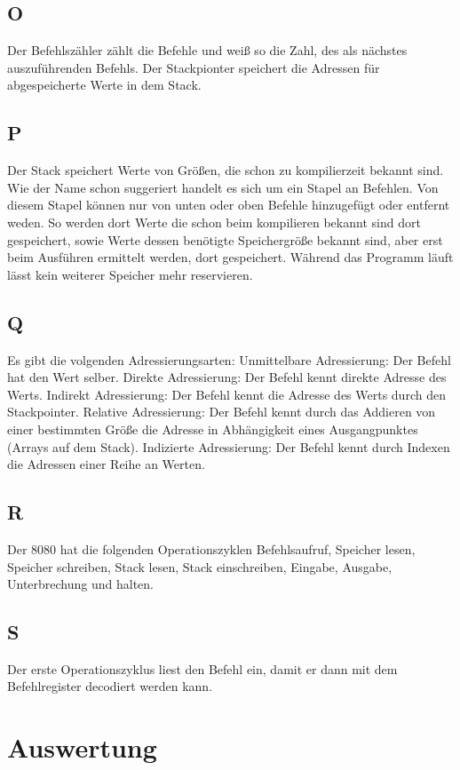 \documentclass[10pt]{article}
\begin{document}
\begin{multicols}{2}
  \subsection*{O}
  Der Befehlszähler zählt die Befehle und weiß so die Zahl, des als nächstes auszuführenden Befehls. Der Stackpionter speichert die Adressen für abgespeicherte Werte in dem Stack.
  \subsection*{P}
  Der Stack speichert Werte von Größen, die schon zu kompilierzeit bekannt sind. Wie der Name schon suggeriert handelt es sich um ein Stapel an Befehlen. Von diesem Stapel können nur von unten oder oben Befehle hinzugefügt oder entfernt weden. So werden dort Werte die schon beim kompilieren bekannt sind dort gespeichert, sowie Werte dessen benötigte Speichergröße bekannt sind, aber erst beim Ausführen ermittelt werden, dort gespeichert. Während das Programm läuft lässt kein weiterer Speicher mehr reservieren.
  \subsection*{Q}
  Es gibt die volgenden Adressierungsarten:
  Unmittelbare Adressierung: Der Befehl hat den Wert selber.
  Direkte Adressierung: Der Befehl kennt direkte Adresse des Werts.
  Indirekt Adressierung: Der Befehl kennt die Adresse des Werts durch den Stackpointer.
  Relative Adressierung: Der Befehl kennt durch das Addieren von einer bestimmten Größe die Adresse in Abhängigkeit eines Ausgangpunktes (Arrays auf dem Stack).
  Indizierte Adressierung: Der Befehl kennt durch Indexen die Adressen einer Reihe an Werten.
  \subsection*{R}
  Der 8080 hat die folgenden Operationszyklen Befehlsaufruf, Speicher lesen, Speicher schreiben, Stack lesen, Stack einschreiben, Eingabe, Ausgabe, Unterbrechung und halten.
  \subsection*{S}
  Der erste Operationszyklus liest den Befehl ein, damit er dann mit dem Befehlregister decodiert werden kann.


  
	\section{Auswertung}

\end{multicols}
\end{document}

